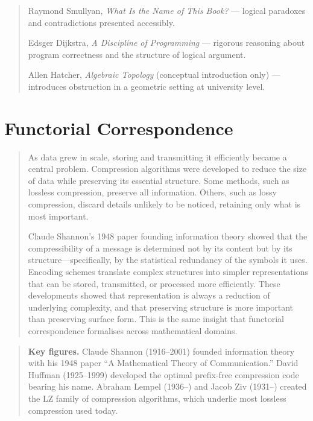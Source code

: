 \documentclass[11pt]{book}
\theoremstyle{plain}
\theoremstyle{definition}
\theoremstyle{remark}
\newenvironment{historicalpreamble}
  {\begin{quote}\small}
  {\end{quote}}
\newenvironment{historicalfigures}
  {\begin{quote}\small\textbf{Key figures.}\enspace\ignorespaces}
  {\end{quote}}
\newenvironment{readinglist}
  {\begin{quote}\small}
  {\end{quote}}
\begin{document}
\begin{readinglist}
Raymond Smullyan, \textit{What Is the Name of This Book?} ---
logical paradoxes and contradictions presented accessibly.

Edsger Dijkstra, \textit{A Discipline of Programming} --- rigorous
reasoning about program correctness and the structure of logical
argument.

Allen Hatcher, \textit{Algebraic Topology} (conceptual introduction
only) --- introduces obstruction in a geometric setting at university
level.
\end{readinglist}

\chapter{Functorial Correspondence}

\begin{historicalpreamble}
As data grew in scale, storing and transmitting it efficiently became a
central problem. Compression algorithms were developed to reduce the size
of data while preserving its essential structure. Some methods, such as
lossless compression, preserve all information. Others, such as lossy
compression, discard details unlikely to be noticed, retaining only what
is most important.

Claude Shannon's 1948 paper founding information theory showed that the
compressibility of a message is determined not by its content but by its
structure---specifically, by the statistical redundancy of the symbols it
uses. Encoding schemes translate complex structures into simpler
representations that can be stored, transmitted, or processed more
efficiently. These developments showed that representation is always a
reduction of underlying complexity, and that preserving structure is more
important than preserving surface form. This is the same insight that
functorial correspondence formalises across mathematical domains.
\end{historicalpreamble}

\begin{historicalfigures}
Claude Shannon (1916--2001) founded information theory with his 1948
paper ``A Mathematical Theory of Communication.'' David Huffman
(1925--1999) developed the optimal prefix-free compression code bearing
his name. Abraham Lempel (1936--) and Jacob Ziv (1931--) created the
LZ family of compression algorithms, which underlie most lossless
compression used today.
\end{historicalfigures}
\end{document}
